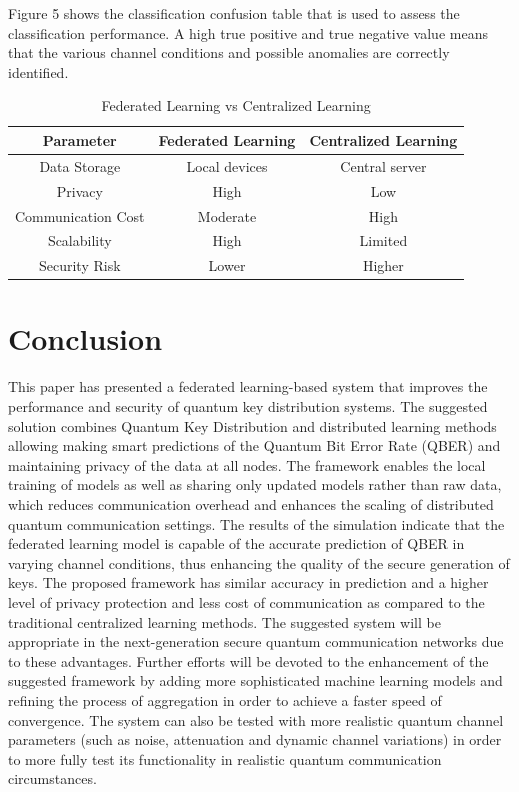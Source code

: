 \documentclass[conference]{IEEEtran}
\begin{document}
\noindent
Figure 5 shows the classification confusion table that is used to assess the classification performance. A high true positive and true negative value means that the various channel conditions and possible anomalies are correctly identified.
\FloatBarrier

\begin{table}[htbp]
\caption{Federated Learning vs Centralized Learning}
\centering
\begin{tabular}{|c|c|c|}
\hline
Parameter & Federated Learning & Centralized Learning \\
\hline
Data Storage & Local devices & Central server \\
\hline
Privacy & High & Low \\
\hline
Communication Cost & Moderate & High \\
\hline
Scalability & High & Limited \\
\hline
Security Risk & Lower & Higher \\
\hline
\end{tabular}
\end{table}

\section{Conclusion}

This paper has presented a federated learning-based system that improves the performance and security of quantum key distribution systems. The suggested solution combines Quantum Key Distribution and distributed learning methods allowing making smart predictions of the Quantum Bit Error Rate (QBER) and maintaining privacy of the data at all nodes. The framework enables the local training of models as well as sharing only updated models rather than raw data, which reduces communication overhead and enhances the scaling of distributed quantum communication settings. 
The results of the simulation indicate that the federated learning model is capable of the accurate prediction of QBER in varying channel conditions, thus enhancing the quality of the secure generation of keys. The proposed framework has similar accuracy in prediction and a higher level of privacy protection and less cost of communication as compared to the traditional centralized learning methods. The suggested system will be appropriate in the next-generation secure quantum communication networks due to these advantages. 
Further efforts will be devoted to the enhancement of the suggested framework by adding more sophisticated machine learning models and refining the process of aggregation in order to achieve a faster speed of convergence. The system can also be tested with more realistic quantum channel parameters (such as noise, attenuation and dynamic channel variations) in order to more fully test its functionality in realistic quantum communication circumstances. 
\FloatBarrier
\end{document}
